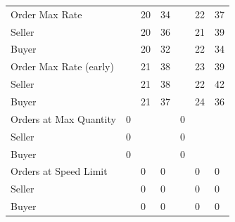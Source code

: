 \begin{tabular}{lllllll}
 Order Max Rate           &          & 20            & 34            &           & 22            & 37            \\
 Seller                   &          & 20            & 36            &           & 21            & 39            \\
 Buyer                    &          & 20            & 32            &           & 22            & 34            \\
 Order Max Rate (early)   &          & 21            & 38            &           & 23            & 39            \\
 Seller                   &          & 21            & 38            &           & 22            & 42            \\
 Buyer                    &          & 21            & 37            &           & 24            & 36            \\
 Orders at Max Quantity   & 0        &               &               & 0         &               &               \\
 Seller                   & 0        &               &               & 0         &               &               \\
 Buyer                    & 0        &               &               & 0         &               &               \\
 Orders at Speed Limit    &          & 0             & 0             &           & 0             & 0             \\
 Seller                   &          & 0             & 0             &           & 0             & 0             \\
 Buyer                    &          & 0             & 0             &           & 0             & 0             \\
\hline
\end{tabular}